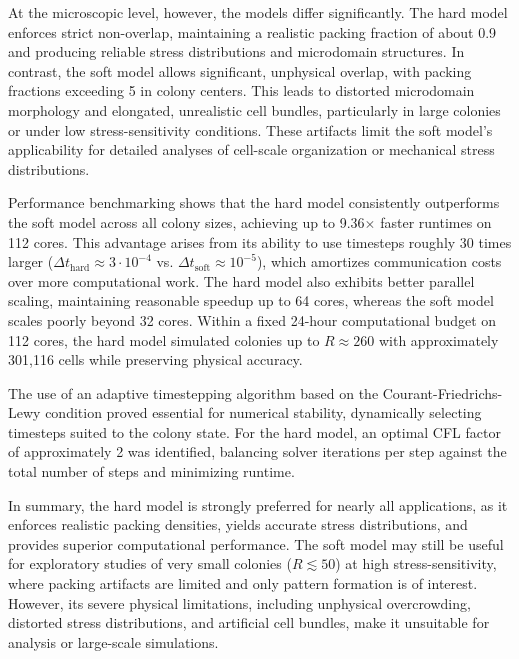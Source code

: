 \documentclass[conference]{IEEEtran}
\begin{document}
At the microscopic level, however, the models differ significantly. The hard model enforces strict non-overlap, maintaining a realistic packing fraction of about 0.9 and producing reliable stress distributions and microdomain structures. In contrast, the soft model allows significant, unphysical overlap, with packing fractions exceeding 5 in colony centers. This leads to distorted microdomain morphology and elongated, unrealistic cell bundles, particularly in large colonies or under low stress-sensitivity conditions. These artifacts limit the soft model's applicability for detailed analyses of cell-scale organization or mechanical stress distributions.

Performance benchmarking shows that the hard model consistently outperforms the soft model across all colony sizes, achieving up to 9.36$\times$ faster runtimes on 112 cores. This advantage arises from its ability to use timesteps roughly 30 times larger ($\Delta t_{\text{hard}} \approx 3 \cdot 10^{-4}$ vs. $\Delta t_{\text{soft}} \approx 10^{-5}$), which amortizes communication costs over more computational work. The hard model also exhibits better parallel scaling, maintaining reasonable speedup up to 64 cores, whereas the soft model scales poorly beyond 32 cores. Within a fixed 24-hour computational budget on 112 cores, the hard model simulated colonies up to $R \approx 260$ with approximately 301,116 cells while preserving physical accuracy.

The use of an adaptive timestepping algorithm based on the Courant-Friedrichs-Lewy condition proved essential for numerical stability, dynamically selecting timesteps suited to the colony state. For the hard model, an optimal CFL factor of approximately 2 was identified, balancing solver iterations per step against the total number of steps and minimizing runtime.

In summary, the hard model is strongly preferred for nearly all applications, as it enforces realistic packing densities, yields accurate stress distributions, and provides superior computational performance. The soft model may still be useful for exploratory studies of very small colonies ($R \lesssim 50$) at high stress-sensitivity, where packing artifacts are limited and only pattern formation is of interest. However, its severe physical limitations, including unphysical overcrowding, distorted stress distributions, and artificial cell bundles, make it unsuitable for analysis or large-scale simulations.

\newpage
\end{document}
